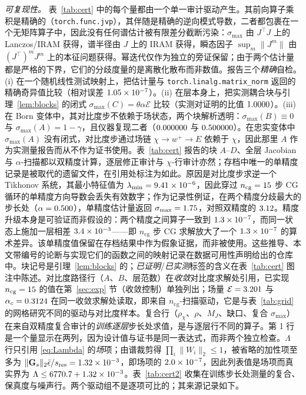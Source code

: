 \documentclass[UTF8,a4paper,11pt]{ctexart}
\newcommand{\norm}[1]{\lVert #1 \rVert}
\newcommand{\numv}[1]{#1}
\begin{document}
\emph{可复现性。} 表~\ref{tab:cert} 中的每个量都由一个单一审计驱动产生。其前向算子乘积是精确的（\texttt{torch.func.jvp}），其伴随是精确的逆向模式导数，二者都包裹在一个无矩阵算子中，因此没有任何谱估计被有限差分截断污染：$\sigma_{\max}$ 由 $J^{\!\top}\!J$ 上的 Lanczos/IRAM 获得，谱半径由 $J$ 上的 IRAM 获得，瞬态因子 $\sup_m\|J^m\|$ 由 $(J^{\!\top})^mJ^m$ 上的本征问题获得。幂迭代仅作为独立的旁证保留；由于两个估计量都是严格的下界，它们的分歧度量的是离散化散布而非数值。报告三个\emph{精确}自检。(i) 在一个随机线性测试映射上，把估计量与 \texttt{torch.linalg.matrix\_norm} 返回的精确奇异值比较（相对误差 $\numv{\NumInstrErr}$）。(ii) 在层本身上，把实测耦合块与引理~\ref{lem:blocks} 的闭式 $\sigma_{\max}(C)=\theta\alpha\mathcal{E}$ 比较（实测对证明的比值 $\numv{\NumSigCRatio}$）。(iii) 在 Born 变体中，其对比度步不依赖于场状态，两个块解析透明：$\sigma_{\max}(B)\equiv0$ 与 $\sigma_{\max}(A)=1-\gamma$，且仪器复现二者（$\numv{\NumBornSigmaB}$ 与 $\numv{\NumBornSigmaA}$）。在忠实变体中 $\sigma_{\max}(A)$ 没有闭式，对比度步通过场链 $\chi\to w^+\to E$ 依赖于 $\chi$，因此那里 $A$ 作为实测量报告而从不作为证书使用。表~\ref{tab:cert} 报告的块 $A$--$D$、全层 Jacobian 与 $\alpha$-扫描都以双精度计算，逐层修正审计与 $\chi$-行审计亦然；存档中唯一的单精度记录是被取代的遗留文件，在引用处标注为如此。原因是对比度步求逆一个 Tikhonov 系统，其最小特征值为 $\lambda_{\min}=\numv{\NumLamMin}$，因此穿过 $n_{\mathrm{cg}}=\numv{\NumNCg}$ 步 CG 循环的单精度方向导数会丢失有效数字；作为记录性例证，在两个精度分歧最大的步长处（$\alpha=\numv{\NumPrecAlphaWorst}$），单精度估计量返回 $\sigma_{\max}=\numv{\NumSigSingleWorst}$，对照双精度的 $\numv{\NumSigDoubleWorst}$。精度升级本身是可验证而非假设的：两个精度之间算子一致到 $\numv{\NumOpPrecRel}$，而同一状态上施加一层相差 $\numv{\NumLayerPrecAmp}$——即 $n_{\mathrm{cg}}$ 步 CG 求解放大了一个 $\numv{\NumOpPrecRel}$ 的算术差异。该单精度值保留在存档结果中作为假象证据，而非被使用。这些推导、本文带编号的论断与实现它们的函数之间的映射记录在数据可用性声明给出的仓库中。块记号是引理~\ref{lem:blocks} 的；\emph{已证明}/\emph{已实测}标签的含义在表~\ref{tab:cert} 图注中陈述。对比度路径行（$A$、$B$、层范数）在\emph{收敛}对比度求解处引用，已实现 $n_{\mathrm{cg}}=\numv{\NumNCg}$ 的值在第~\ref{sec:exp} 节（收敛控制）单独列出；场量 $\mathcal{E}=\numv{\NumEColMax}$ 与 $\alpha_c=\numv{\NumAlphaC}$ 在同一收敛求解处读取，即来自 $n_{\mathrm{cg}}$-扫描驱动，它是与表~\ref{tab:grid} 的网格研究不同的驱动与对比度样本。复合行（$\rho_\chi$、$\rho$、$M_J$、缺口、复合 $\sigma_{\max}$）在来自双精度复合审计的\emph{训练逐层}步长处求值，是与逐层行不同的算子。第 1 行是一个量显示在两列，因为设计值与证书是同一表达式，而非两个独立检查。$\Lambda$ 行只引用 \eqref{eq:Lambda} 的\emph{场}项；由谱裁剪得 $\prod_i\norm{W_i}_2\le1$，被省略的加性项至多为 $\norm{\mathbf{G}_s}_2\bar\epsilon/s_{\mathrm{res}}=\numv{\NumLamCorrTerm}$，即场项的 $\numv{\NumLamCorrRatio}$，因此列表值是场项而真实界为 $\Lambda\le\numv{\NumLambdaBound}+\numv{\NumLamCorrTerm}$。表~\ref{tab:cert2} 收集在训练步长处测量的复合、保真度与噪声行。两个驱动组不是逐项可比的；其来源记录如下。
\end{document}
